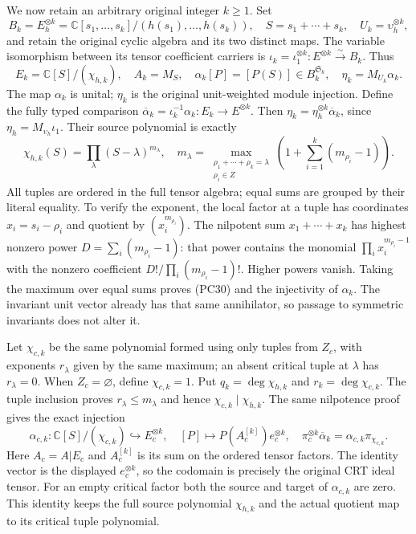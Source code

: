 \documentclass{article}
\begin{document}
We now retain an arbitrary original integer $k\ge1$.  Set
\[
 B_k=E_h^{\otimes k}
  =\mathbb C[s_1,\ldots,s_k]/(h(s_1),\ldots,h(s_k)),\quad
 S=s_1+\cdots+s_k,\quad U_k=\upsilon_h^{\otimes k},
 \tag{PC28}
\]
and retain the original cyclic algebra and its two distinct maps.
The variable isomorphism between its tensor coefficient carriers is
$\iota_k=\iota_1^{\otimes k}:E^{\otimes k}\xrightarrow{\sim}B_k$.
Thus
\[
 E_k=\mathbb C[S]/(\chi_{h,k}),\quad A_k=M_S,\quad
 \alpha_k[P]=[P(S)]\in B_k^{\mathfrak S_k},\quad
 \eta_k=M_{U_k}\alpha_k.
 \tag{PC29}
\]
The map $\alpha_k$ is unital; $\eta_k$ is the original unit-weighted
module injection.  Define the fully typed comparison
$\overline\alpha_k=\iota_k^{-1}\alpha_k:E_k\to E^{\otimes k}$.
Then $\eta_k=\eta_h^{\otimes k}\overline\alpha_k$, since
$\eta_h=M_{\upsilon_h}\iota_1$.  Their source polynomial is exactly
\[
 \chi_{h,k}(S)=\prod_\lambda(S-\lambda)^{m_\lambda},\quad
 m_\lambda=\max_{\substack{\rho_1+\cdots+\rho_k=\lambda\\\rho_i\in Z}}
          \left(1+\sum_{i=1}^k(m_{\rho_i}-1)\right).
 \tag{PC30}
\]
All tuples are ordered in the full tensor algebra; equal sums are
grouped by their literal equality.  To verify the exponent, the local
factor at a tuple has coordinates $x_i=s_i-\rho_i$ and quotient
by $(x_i^{m_{\rho_i}})$.  The nilpotent sum
$x_1+\cdots+x_k$ has highest nonzero power
$D=\sum_i(m_{\rho_i}-1)$: that power contains the monomial
$\prod_i x_i^{m_{\rho_i}-1}$ with the nonzero coefficient
$D!/\prod_i(m_{\rho_i}-1)!$.  Higher powers vanish.  Taking the
maximum over equal sums proves (PC30) and the injectivity of
$\alpha_k$.  The invariant unit vector already has that same
annihilator, so passage to symmetric invariants does not alter it.

Let $\chi_{c,k}$ be the same polynomial formed using only tuples
from $Z_c$, with exponents $r_\lambda$ given by the same maximum;
an absent critical tuple at $\lambda$ has $r_\lambda=0$.
When $Z_c=\varnothing$, define $\chi_{c,k}=1$.  Put
$q_k=\deg\chi_{h,k}$ and $r_k=\deg\chi_{c,k}$.
The tuple inclusion proves $r_\lambda\le m_\lambda$ and hence
$\chi_{c,k}\mid\chi_{h,k}$.  The same nilpotence proof gives
the exact injection
\[
 \alpha_{c,k}:\mathbb C[S]/(\chi_{c,k})
                  \hookrightarrow E_c^{\otimes k},\quad
 [P]\mapsto P(A_c^{[k]})e_c^{\otimes k},
 \quad
 \pi_c^{\otimes k}\overline\alpha_k=
          \alpha_{c,k}\pi_{\chi_{c,k}}.
 \tag{PC31}
\]
Here $A_c=A|E_c$ and $A_c^{[k]}$ is its sum on the ordered
tensor factors.  The identity vector is the displayed $e_c^{\otimes k}$,
so the codomain is precisely the original CRT ideal tensor.
For an empty critical factor both the source and target of
$\alpha_{c,k}$ are zero.  This identity keeps the full source
polynomial $\chi_{h,k}$ and the actual quotient map to its critical
tuple polynomial.
\end{document}
